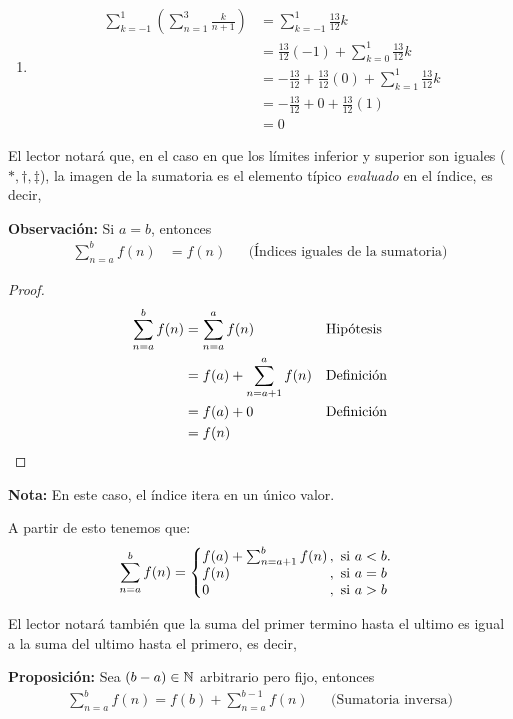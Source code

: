 \begin{enumerate}
  \item \begin{align*}
    \sum_{k=-1}^{1} \left(\sum_{n=1}^{3} \frac{k}{n+1}\right) &= \sum_{k=-1}^{1} \frac{13}{12}k\\
    &= \frac{13}{12} (-1) + \sum_{k=0}^{1} \frac{13}{12}k\\
    &= - \frac{13}{12} + \frac{13}{12} (0) + \sum_{k=1}^{1} \frac{13}{12}k\\
    &= - \frac{13}{12} + 0 + \frac{13}{12} (1)\\
    &= 0
  \end{align*}
\end{enumerate}


  El lector notará que, en el caso en que los límites inferior y superior son iguales ($*, \dag, \ddag$), la imagen de la sumatoria es el elemento típico \textit{evaluado} en el índice, es decir,

  \textbf{Observación:} Si $a=b$, entonces
  \begin{align*}
    \sum_{n=a}^{b} f(n) &= f(n) && \text{(Índices iguales de la sumatoria)}
  \end{align*}

  \begin{proof}\leavevmode
  \begin{align*}
    \sum_{n=a}^{b} f(n) &= \sum_{n=a}^{a} f(n) && \text{Hipótesis}\\
    &= f(a) + \sum_{n=a+1}^{a} f(n) && \text{Definición}\\
    &= f(a) + 0 && \text{Definición}\\
    &= f(n) && \qedhere
  \end{align*}
  \end{proof}

  \textbf{Nota:} En este caso, el índice itera en un único valor.

  A partir de esto tenemos que:
  \[
    \sum_{n=a}^{b} f(n) = \left\{
    \begin{array}{@{}l@{\thinspace}l}
    f(a) + \sum_{n=a+1}^{b} f(n) &,  \ \text{si}  \ a<b.\\
    f(n) &,  \ \text{si}  \ a=b\\
    0 &,  \ \text{si}  \ a>b
    \end{array} \right. \]

    El lector notará también que la suma del primer termino hasta el ultimo es
    igual a la suma del ultimo hasta el primero, es decir,

    \textbf{Proposición:} Sea $(b-a)\in \mathbb{N}$ arbitrario pero fijo, entonces
    \begin{align*}
      \sum_{n=a}^{b} f(n) = f(b) + \sum_{n=a}^{b-1} f(n) && \text{(Sumatoria inversa)}
    \end{align*}

